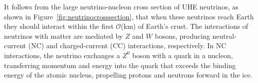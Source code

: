   It follows from the large neutrino-nucleon cross section of UHE neutrinos, as shown in Figure~\ref{fig:neutrinocrosssection}, that when these neutrinos reach Earth they should interact within the first $\mathcal{O}$(km) of Earth's crust.
  The interactions of neutrinos with matter are mediated by $Z$ and $W$ bosons, producing neutral-current (NC) and charged-current (CC) interactions, respectively. 
  In NC interactions, the neutrino exchanges a $Z^0$ boson with a quark in a nucleon, transferring momentum and energy into the quark that exceeds the binding energy of the atomic nucleus, propelling protons and neutrons forward in the ice.
  \begin{center}
  \end{center}

